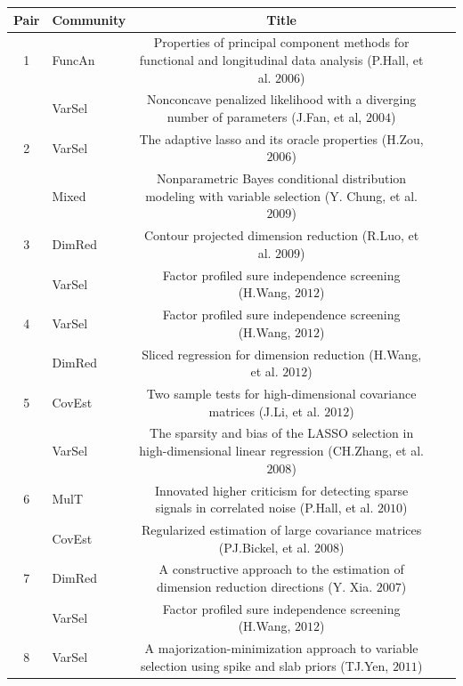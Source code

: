 \documentclass[AMS,STIX1COL]{WileyNJD-v2}
\begin{document}
{%
\begin{table}[htbp]
\centering
\begin{tabular}{clclc}\hline
Pair & Community & Title & \\
\hline
1    & FuncAn    & Properties of principal component methods for functional and longitudinal data analysis (P.Hall, et al. $2006$)      & \\
     & VarSel    & Nonconcave penalized likelihood with a diverging number of parameters (J.Fan, et al, $2004$)                       & \\
2    & VarSel      & The adaptive lasso and its oracle properties (H.Zou, $2006$)                             & \\
     & Mixed    & Nonparametric Bayes conditional distribution modeling with variable selection (Y. Chung, et al. $2009$)    & \\
3    & DimRed    & Contour projected dimension reduction (R.Luo, et al. $2009$)                                                     & \\
     & VarSel    & Factor profiled sure independence screening (H.Wang, $2012$)& \\
4    & VarSel    & Factor profiled sure independence screening (H.Wang, $2012$)& \\
     & DimRed    & Sliced regression for dimension reduction (H.Wang, et al. $2012$) & \\
5    & CovEst    & Two sample tests for high-dimensional covariance matrices (J.Li, et al. $2012$)& \\
     & VarSel      & The sparsity and bias of the {LASSO} selection in high-dimensional linear regression (CH.Zhang, et al. $2008$)        & \\
6    & MulT    & Innovated higher criticism for detecting sparse signals in correlated noise (P.Hall, et al. $2010$)       & \\
     & CovEst     & Regularized estimation of large covariance matrices (PJ.Bickel, et al. $2008$)    &  \\
7    & DimRed    & A constructive approach to the estimation of dimension reduction directions (Y. Xia. $2007$)       & \\
     & VarSel     & Factor profiled sure independence screening (H.Wang, $2012$)    & \\
8    & VarSel    & A majorization-minimization approach to variable selection using spike and slab priors (TJ.Yen, $2011$) & \\

\end{tabular}
\end{table}}
\end{document}
